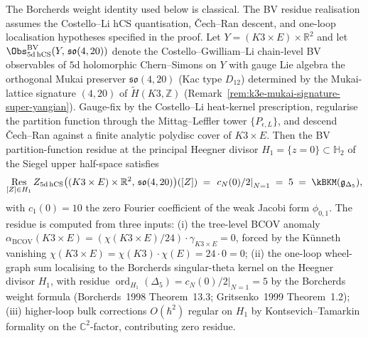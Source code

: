 \begin{theorem}[BV partition-function residue at the Humbert locus: $\kBKM(\mathfrak{g}_{\Delta_5}) = 5$]
\label{thm:bl-bv-k3e-kappa5}
The Borcherds weight identity used below is classical. The BV residue
realisation assumes the Costello--Li hCS quantisation, \v{C}ech--Ran
descent, and one-loop localisation hypotheses specified in the proof.
Let $Y = (K3 \times E) \times \mathbb{R}^2$ and let $\Obs^{\mathrm{BV}}_{5\mathrm{d\,hCS}}(Y,\, \mathfrak{so}(4, 20))$ denote the Costello--Gwilliam--Li chain-level BV observables of $5$d holomorphic Chern--Simons on $Y$ with gauge Lie algebra the orthogonal Mukai preserver $\mathfrak{so}(4, 20)$ \textup{(}Kac type $D_{12}$\textup{)} determined by the Mukai-lattice signature $(4, 20)$ of $\widetilde{H}(K3, \mathbb{Z})$ (Remark~\ref{rem:k3e-mukai-signature-super-yangian}). Gauge-fix by the Costello--Li heat-kernel prescription, regularise the partition function through the Mittag--Leffler tower $\{P_{\epsilon, L}\}$, and descend \v{C}ech--Ran against a finite analytic polydisc cover of $K3 \times E$. Then the BV partition-function residue at the principal Heegner divisor $H_1 = \{z = 0\} \subset \mathbb{H}_2$ of the Siegel upper half-space satisfies
\[
 \underset{[Z] \in H_1}{\operatorname*{Res}}\,
 Z_{5\mathrm{d\,hCS}}\bigl( (K3 \times E) \times \mathbb{R}^2,\,
 \mathfrak{so}(4, 20) \bigr)([Z])
 \;=\; \left.c_N(0)/2\right|_{N=1} \;=\; 5
 \;=\; \kBKM(\mathfrak{g}_{\Delta_5}),
\]
with $c_1(0) = 10$ the zero Fourier coefficient of the weak Jacobi form $\phi_{0,1}$. The residue is computed from three inputs: (i) the tree-level BCOV anomaly $\alpha_{\mathrm{BCOV}}(K3 \times E) = (\chi(K3 \times E)/24) \cdot \gamma_{K3 \times E} = 0$, forced by the K\"unneth vanishing $\chi(K3 \times E) = \chi(K3) \cdot \chi(E) = 24 \cdot 0 = 0$; (ii) the one-loop wheel-graph sum localising to the Borcherds singular-theta kernel on the Heegner divisor $H_1$, with residue $\operatorname{ord}_{H_1}(\Delta_5) = \left.c_N(0)/2\right|_{N=1} = 5$ by the Borcherds weight formula (Borcherds~1998 Theorem~13.3; Gritsenko~1999 Theorem~1.2); (iii) higher-loop bulk corrections $O(\hbar^2)$ regular on $H_1$ by Kontsevich--Tamarkin formality on the $\mathbb{C}^2$-factor, contributing zero residue.
\end{theorem}

